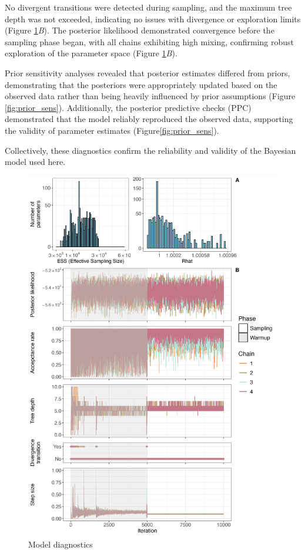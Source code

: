 \documentclass{article}
\begin{document}
No divergent transitions were detected during sampling, and the maximum tree depth was not exceeded, indicating no issues with divergence or exploration limits (Figure \ref{fig:diagnostics}\textit{B}). The posterior likelihood demonstrated convergence before the sampling phase began, with all chains exhibiting high mixing, confirming robust exploration of the parameter space (Figure \ref{fig:diagnostics}\textit{B}).

Prior sensitivity analyses revealed that posterior estimates differed from priors, demonstrating that the posteriors were appropriately updated based on the observed data rather than being heavily influenced by prior assumptions (Figure \ref{fig:prior_sens}). Additionally, the posterior predictive checks (PPC) demonstrated that the model reliably reproduced the observed data, supporting the validity of parameter estimates (Figure\ref{fig:prior_sens}). 

Collectively, these diagnostics confirm the reliability and validity of the Bayesian model used here.

\begin{figure}[tbhp] 
\centering
\includegraphics[width=16.5cm]{Plots/Diagnostic_Fig_1.jpg}  
\caption{Model diagnostics}
\label{fig:diagnostics}
\end{figure}
\end{document}
